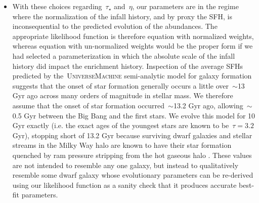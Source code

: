 \documentclass[ms.tex]{subfiles}
\begin{document}
\begin{itemize}
	\item With these choices regarding~$\tau_\star$ and~$\eta$, our parameters
	are in the regime where the normalization of the infall history, and by
	proxy the SFH, is inconsequential to the predicted evolution of the
	abundances.
	The appropriate likelihood function is therefore equation
	 with normalized weights, whereas equation
	 with un-normalized weights would be the proper
	form if we had selected a parameterization in which the absolute scale of
	the infall history did impact the enrichment history.
	Inspection of the average SFHs predicted by the~\textsc{UniverseMachine}
	semi-analytic model for galaxy formation~\citep{Behroozi2019} suggests that
	the onset of star formation generally occurs a little over~$\sim$13 Gyr ago
	across many orders of magnitude in stellar mass.
	We therefore assume that the onset of star formation occurred~$\sim$13.2
	Gyr ago, allowing~$\sim$0.5 Gyr between the Big Bang and the first stars.
	We evolve this model for 10 Gyr exactly (i.e. the exact ages of the
	youngest stars are known to be~$\tau = 3.2$ Gyr), stopping short of 13.2
	Gyr because surviving dwarf galaxies and stellar streams in the Milky Way
	halo are known to have their star formation quenched
	\citep[e.g.][]{Monelli2010a, Monelli2010b, Sohn2013, Weisz2014a, Weisz2014b,
	Weisz2015} by ram pressure stripping from the hot gaseous halo
	\citep[e.g.][]{Steyrleithner2020}.
	These values are not intended to resemble any one galaxy, but instead to
	qualitatively resemble some dwarf galaxy whose evolutionary parameters can
	be re-derived using our likelihood function as a sanity check that it
	produces accurate best-fit parameters.



\end{itemize}
\end{document}
